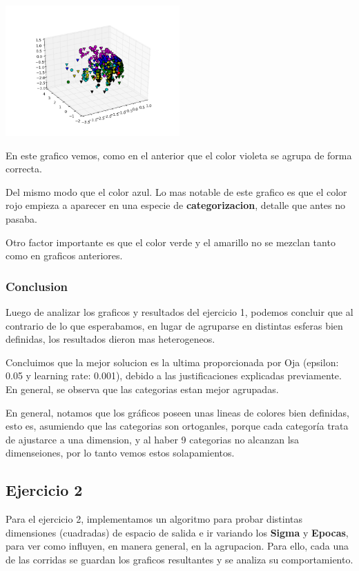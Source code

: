 \includegraphics[width=0.5\textwidth]{img/ej1_oja_005_240}

En este grafico vemos, como en el anterior que el color violeta se agrupa de forma correcta.

Del mismo modo que el color azul. Lo mas notable de este grafico es que el color rojo empieza a aparecer en una especie de \textbf{categorizacion}, detalle que antes no pasaba. 

Otro factor importante es que el color verde y el amarillo no se mezclan tanto como en graficos anteriores.

\subsubsection{Conclusion}

Luego de analizar los graficos y resultados del ejercicio 1, podemos concluir que al contrario de lo que esperabamos, en lugar de agruparse en distintas esferas bien definidas, los resultados dieron mas heterogeneos.

Concluimos que la mejor solucion es la ultima proporcionada por Oja (epsilon: 0.05 y learning rate: 0.001), debido a las justificaciones explicadas previamente. En general, se observa que las categorias estan mejor agrupadas.

En general, notamos que los gr\'aficos poseen unas lineas de colores bien definidas, esto es, asumiendo que las categorias son ortoganles, porque cada categor\'ia trata de ajustarce a una dimension, y al haber 9 categorias no alcanzan lsa dimenseiones, por lo tanto vemos estos solapamientos.

\subsection{Ejercicio 2}

Para el ejercicio 2, implementamos un algoritmo para probar distintas dimensiones (cuadradas) de espacio de salida e ir variando los \textbf{Sigma} y \textbf{Epocas}, para ver como influyen, en manera general, en la agrupacion. Para ello, cada una de las corridas se guardan los graficos resultantes y se analiza su comportamiento.

